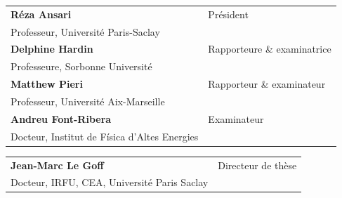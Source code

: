 \begin{titlepage}
\scriptsize
\begin{tabular}{|p{9cm}l}
\arrayrulecolor{Prune}
\textbf{Réza Ansari} &   Président\\ 
Professeur, Université Paris-Saclay & \\
\textbf{Delphine Hardin} &  Rapporteure \& examinatrice \\ 
Professeure, Sorbonne Université   &   \\ 
\textbf{Matthew Pieri} &  Rapporteur \& examinateur \\ 
Professeur, Université Aix-Marseille  &   \\ 
\textbf{Andreu Font-Ribera} &  Examinateur \\ 
Docteur, Institut de Física d’Altes Energies   &   \\ 

\end{tabular} 



\medskip
\begin{tabular}{p{9cm}l}\arrayrulecolor{white}
  \textbf{Jean-Marc Le Goff} &  Directeur de thèse \\ 
  Docteur, IRFU, CEA, Université Paris Saclay   &   \\ 



\end{tabular} 


\end{titlepage}